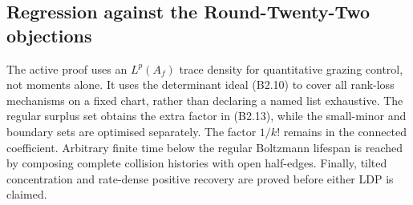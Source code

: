 \subsection{Regression against the Round-Twenty-Two objections}

The active proof uses an $L^p(A_f)$ trace density for quantitative grazing
control, not moments alone.  It uses the determinant ideal (B2.10) to cover all
rank-loss mechanisms on a fixed chart, rather than declaring a named list
exhaustive.  The regular surplus set obtains the extra factor in (B2.13), while
the small-minor and boundary sets are optimised separately.  The factor
$1/k!$ remains in the connected coefficient.  Arbitrary finite time below the
regular Boltzmann lifespan is reached by composing complete collision
histories with open half-edges.  Finally, tilted concentration and rate-dense
positive recovery are proved before either LDP is claimed.
